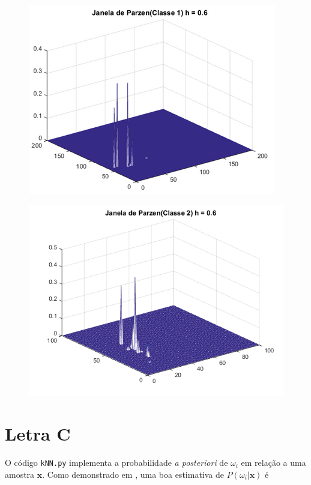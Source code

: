 \documentclass[12pt,twoside]{report}
\newcommand{\code}[1]{\texttt{#1}}
\begin{document}
\begin{figure}[ht]
    \centering
    \includegraphics[scale=0.7]{parzen_c1_h06}
    \caption{}
    \label{fig:parzen_c1_h06}
\end{figure}

\begin{figure}[ht]
    \centering
    \includegraphics[scale=0.7]{parzen_c2_h06}
    \caption{}
    \label{fig:parzen_c2_h06}
\end{figure}


\section*{Letra C}

O código \code{kNN.py} implementa a probabilidade \emph{a posteriori} de $\omega_i$
em relação a uma amostra $\mathbf{x}$. Como demonstrado em \autocite{duda.hart.stork.2000},
uma boa estimativa de $P(\omega_i|\mathbf{x})$ é
\end{document}
